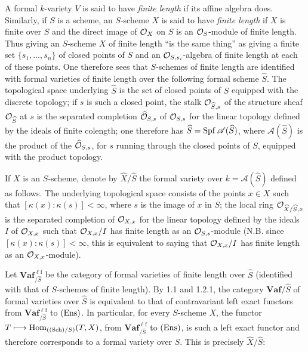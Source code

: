 A formal $k$-variety $V$ is said to have \emph{finite length} if its affine algebra does. Similarly, if $S$ is a scheme, an $S$-scheme $X$ is said to have \emph{finite length} if $X$ is finite over $S$ and the direct image of $\mathcal{O}_X$ on $S$ is an $\mathcal{O}_S$-module of finite length. Thus giving an $S$-scheme $X$ of finite length ``is the same thing'' as giving a finite set $\{s_1,\ldots,s_n\}$ of closed points of $S$ and an $\mathcal{O}_{S,s_i}$-algebra of finite length at each of these points.
One therefore sees that $S$-schemes of finite length are identified with formal varieties of finite length over the following formal scheme $\widehat S$. The topological space underlying $\widehat S$ is the set of closed points of $S$ equipped with the discrete topology; if $s$ is such a closed point, the stalk $\mathcal{O}_{\widehat S,s}$ of the structure sheaf $\mathcal{O}_{\widehat S}$ at $s$ is the separated completion $\widehat{\mathcal{O}}_{S,s}$ of $\mathcal{O}_{S,s}$ for the linear topology defined by the ideals of finite colength; one therefore has $\widehat S=\operatorname{Spf}\mathscr A(\widehat S)$, where $\mathscr A(\widehat S)$ is the product of the $\widehat{\mathcal{O}}_{S,s}$, for $s$ running through the closed points of $S$, equipped with the product topology.
\begin{definition}{}
If $X$ is an $S$-scheme, denote by $\widehat X/\widehat S$ the formal variety over $k=\mathscr A(\widehat S)$ defined as follows. The underlying topological space consists of the points $x\in X$ such that $[\kappa(x):\kappa(s)]<\infty$, where $s$ is the image of $x$ in $S$; the local ring $\mathcal{O}_{\widehat X/\widehat S,x}$ is the separated completion of $\mathcal{O}_{X,x}$ for the linear topology defined by the ideals $I$ of $\mathcal{O}_{X,x}$ such that $\mathcal{O}_{X,x}/I$ has finite length as an $\mathcal{O}_{S,s}$-module (N.B. since $[\kappa(x):\kappa(s)]<\infty$, this is equivalent to saying that $\mathcal{O}_{X,x}/I$ has finite length as an $\mathcal{O}_{X,x}$-module).
\end{definition}
Let $\mathbf{Vaf}_{/\widehat S}^{\ell\mathrm f}$ be the category of formal varieties of finite length over $\widehat S$ (identified with that of $S$-schemes of finite length). By 1.1 and 1.2.1, the category $\mathbf{Vaf}/\widehat S$ of formal varieties over $\widehat S$ is equivalent to that of contravariant left exact functors from $\mathbf{Vaf}_{/\widehat S}^{\ell\mathrm f}$ to $\textup{(Ens)}$. In particular, for every $S$-scheme $X$, the functor $T\longmapsto\operatorname{Hom}_{(\textup{(Sch)}/S)}(T,X)$, from $\mathbf{Vaf}_{/\widehat S}^{\ell\mathrm f}$ to $\textup{(Ens)}$, is such a left exact functor and therefore corresponds to a formal variety over $\widehat S$. This is precisely $\widehat X/\widehat S$:

